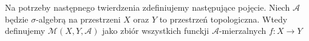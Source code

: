 \begin{defi}
Na potrzeby następnego twierdzenia zdefiniujemy następujące pojęcie. Niech $\mathcal{A}$ będzie
$\sigma$-algebrą na przestrzeni $X$ oraz $Y$ to przestrzeń topologiczna. Wtedy definujemy $\mathcal{M}(X,Y,\mathcal{A})$
jako zbiór wszystkich funckji $\mathcal{A}$-mierzalnych $f:X \rightarrow Y$
\end{defi}